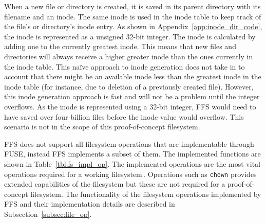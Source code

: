When a new file or directory is created, it is saved in its parent directory with its filename and an inode. The same inode is used in the inode table to keep track of the file's or directory's inode entry. As shown in Appendix~\ref{app:inode_dir_code}, the inode is represented as a unsigned 32-bit integer. The inode is calculated by adding one to the currently greatest inode. This means that new files and directories will always receive a higher greater inode than the ones currently in the inode table. This naïve approach to inode generation does not take in to account that there might be an available inode less than the greatest inode in the inode table (for instance, due to deletion of a previously created file). However, this inode generation approach is fast and will not be a problem until the integer overflows. As the inode is represented using a 32-bit integer, FFS would need to have saved over four billion files before the inode value would overflow. This scenario is not in the scope of this proof-of-concept filesystem.

FFS does not support all filesystem operations that are implementable through FUSE, instead FFS implements a subset of them. The implemented functions are shown in Table~\ref{tbl:fs_impl_op}. The implemented operations are the most vital operations required for a working filesystem\,\cite{kuenningCS135FUSEDocumentation2010}. Operations such as \texttt{chown} provides extended capabilities of the filesystem but these are not required for a proof-of-concept filesystem. The functionality of the filesystem operations implemented by FFS and their implementation details are described in Subsection~\ref{subsec:file_op}. 

